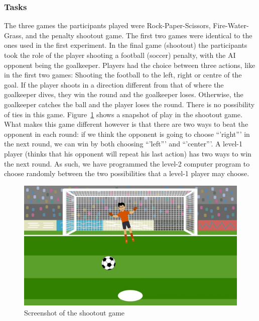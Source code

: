 \documentclass[man,floatsintext]{apa6}
\begin{document}
\hypertarget{tasks-1}{%
\subsubsection{Tasks}\label{tasks-1}}

The three games the participants played were Rock-Paper-Scissors, Fire-Water-Grass, and the penalty shootout game. The first two games were identical to the ones used in the first experiment. In the final game (shootout) the participants took the role of the player shooting a football (soccer) penalty, with the AI opponent being the goalkeeper. Players had the choice between three actions, like in the first two games: Shooting the football to the left, right or centre of the goal. If the player shoots in a direction different from that of where the goalkeeper dives, they win the round and the goalkeeper loses. Otherwise, the goalkeeper catches the ball and the player loses the round. There is no possibility of ties in this game. Figure~\ref{fig:screenshot-shootout} shows a snapshot of play in the shootout game. What makes this game different however is that there are two ways to beat the opponent in each round: if we think the opponent is going to choose \enquote{'right}' in the next round, we can win by both choosing \enquote{'left}' and \enquote{'center}'. A level-1 player (thinks that his opponent will repeat his last action) has two ways to win the next round. As such, we have programmed the level-2 computer program to choose randomly between the two possibilities that a level-1 player may choose.

\begin{figure}

{\centering \includegraphics{images/shootout} 

}

\caption{Screenshot of the shootout game}\label{fig:screenshot-shootout}
\end{figure}
\end{document}
